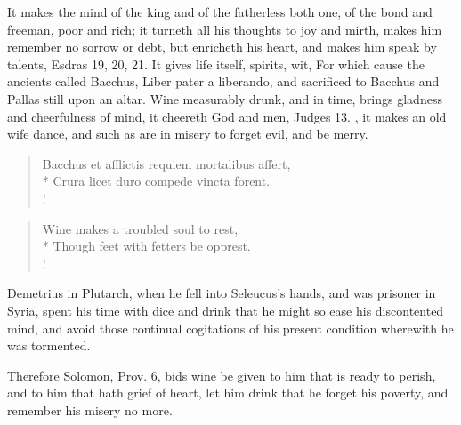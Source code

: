It makes the mind of the king and of the fatherless both one, of the
bond and freeman, poor and rich; it turneth all his thoughts to joy and
mirth, makes him remember no sorrow or debt, but enricheth his heart,
and makes him speak by talents, Esdras  19, 20, 21. It gives life
itself, spirits, wit, \etc{} For which cause the ancients called Bacchus,
Liber pater a liberando, and sacrificed to Bacchus and Pallas
still upon an altar. Wine measurably drunk, and in time, brings
gladness and cheerfulness of mind, it cheereth God and men, Judges 
13. , it makes an old wife dance, and such as
are in misery to forget evil, and be merry.
%
\begin{latin}
\begin{verse}
Bacchus et afflictis requiem mortalibus affert,\\*
Crura licet duro compede vincta forent.\\!
\end{verse}
\end{latin}
\translationrule
\begin{verse}
Wine makes a troubled soul to rest,\\*
Though feet with fetters be opprest.\\!
\end{verse}%

Demetrius in Plutarch, when he fell into Seleucus's hands, and was
prisoner in Syria, spent his time with dice and drink that he
might so ease his discontented mind, and avoid those continual
cogitations of his present condition wherewith he was tormented.

Therefore Solomon, Prov.  6, bids wine be given to him that is
ready to perish, and to him that hath grief of heart, let him
drink that he forget his poverty, and remember his misery no more.


